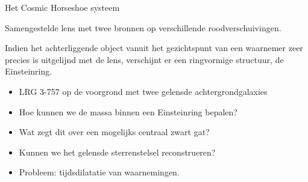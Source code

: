 \documentclass[aspectratio=169,xcolor=dvipsnames]{beamer}
\begin{document}
\begin{frame}{Het Cosmic Horseshoe systeem}



    Samengestelde lens met twee bronnen op verschillende roodverschuivingen.


    Indien het achterliggende object vanuit het gezichtspunt van een waarnemer zeer precies is uitgelijnd met de lens, verschijnt er een ringvormige structuur, de Einsteinring.

    \begin{itemize}
        \item LRG 3-757 op de voorgrond met twee gelensde achtergrondgalaxies
        \item Hoe kunnen we de massa binnen een Einsteinring bepalen?
        \item Wat zegt dit over een mogelijks centraal zwart gat?
        \item Kunnen we het gelensde sterrenstelsel reconstrueren?        \item Probleem: tijdsdilatatie van waarnemingen.
      \end{itemize}
\end{frame}
\end{document}
